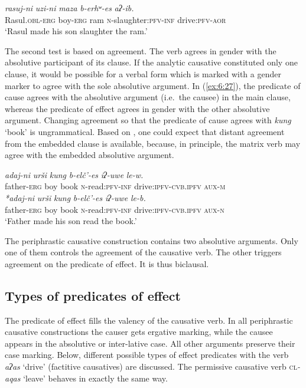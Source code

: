 ﻿\documentclass[output=paper]{langsci/langscibook}
\begin{document}
\ex %
\gll *\emph{rasuj-ni} \emph{uzi-ni} \emph{maza} \emph{b-erhʷ-es} \emph{aʔ-ib.}\\
Rasul.\textsc{obl}-\textsc{erg} boy-\textsc{erg} ram \textsc{n}-slaughter:\textsc{pfv}-\textsc{inf} drive:\textsc{pfv}-\textsc{aor}\\
\glt  `Rasul made his son slaughter the ram.'
\z 
\z

The second test is based on agreement. The verb agrees in gender
with the absolutive participant of its clause. If the analytic causative
constituted only one clause, it would be possible for a verbal form
which is marked with a gender marker to agree with the sole
absolutive argument. In (\ref{ex:6:27}), the predicate of cause agrees with the
absolutive argument (i.e.\ the causee) in the main clause, whereas the
predicate of effect agrees in gender with the other absolutive argument.
Changing agreement so that the predicate of cause agrees with
\emph{kung} `book' is ungrammatical. Based on , one could
expect that distant agreement from the embedded clause is available,
because, in principle, the matrix verb may agree with the embedded
absolutive argument.

\ea \label{ex:6:27} %
\ea %
\gll \emph{adaj-ni}  \emph{urši} \emph{kung} \emph{b-elč'-es} \emph{iʔ-uwe}  \emph{le-w.} \\
father-\textsc{erg}  boy book \textsc{n}-read:\textsc{pfv}-\textsc{inf} drive:\textsc{ipfv}-\textsc{cvb.ipfv}  \textsc{aux}-\textsc{m}\\

\ex %
\gll \emph{*adaj-ni}  \emph{urši} \emph{kung} \emph{b-elč'-es} \emph{iʔ-uwe}  \emph{le-b.}\\
father-\textsc{erg}  boy book \textsc{n}-read:\textsc{pfv}-\textsc{inf} drive:\textsc{ipfv}-\textsc{cvb.ipfv}  \textsc{aux}-\textsc{n}\\
\glt `Father made his son read the book.'
\z
\z

The periphrastic causative construction contains two absolutive
arguments. Only one of them controls the agreement of the causative
verb. The other triggers agreement on the predicate of effect. It is
thus biclausal.

\subsection{Types of predicates of effect}

The predicate of effect fills the valency of the causative verb. In all
periphrastic causative constructions the causer gets ergative marking,
while the causee appears in the absolutive or inter-lative
case. All other arguments preserve their case marking. Below, different
possible types of effect predicates with the verb \emph{aʔas} `drive'
(factitive causatives) are discussed. The permissive causative verb
\textsc{cl}\emph{-aqas} `leave' behaves in exactly the same way.
\end{document}
